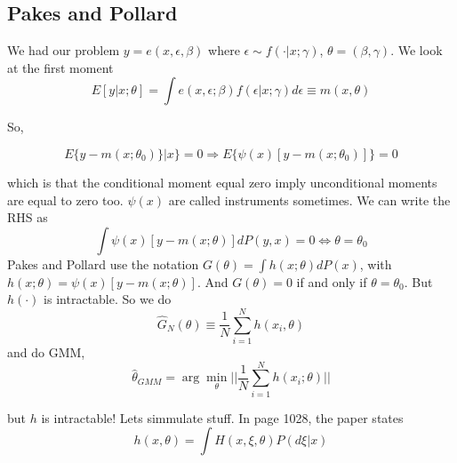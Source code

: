 \documentclass[12pt]{article}
\begin{document}
	\subsection{Pakes and Pollard}

	We had our problem $y=e(x,\epsilon, \beta)$ where $\epsilon \sim f(\cdot | x; \gamma ) $, $\theta = (\beta , \gamma)$. We look at the first moment
	\begin{equation}
		E[y | x; \theta] = \int e(x, \epsilon; \beta) f(\epsilon | x; \gamma) d \epsilon \equiv m(x, \theta)
	\end{equation}

	So,

	\begin{equation}
		E \{ y - m(x; \theta_0 )\} | x \} = 0 \Rightarrow E\{ \psi(x) [y - m(x; \theta_0 )] \} = 0
	\end{equation}

	which is that the conditional moment equal zero imply unconditional moments are equal to zero too. $\psi(x)$ are called instruments sometimes. We can write the RHS as
	\begin{equation}
		\int \psi(x) [y - m(x; \theta)] dP(y,x) = 0 \iff \theta = \theta_0
	\end{equation}
	 Pakes and Pollard use the notation $G(\theta) = \int h(x;\theta) dP(x)$, with $h(x;\theta) = \psi(x) [y - m(x; \theta)]$. And $G(\theta) = 0$ if and only if $\theta = \theta_0$. But $h(\cdot)$ is intractable. So we do
	 \begin{equation}
	 	\hat{G}_N(\theta) \equiv \frac{1}{N} \sum^N_{i=1} h(x_i, \theta)
	 \end{equation}
	 and do GMM,
	 \begin{equation}
	 	\hat{\theta}_{GMM} = \arg\min_{\theta} || \frac{1}{N} \sum^N_{i = 1} h(x_i; \theta) ||
	 \end{equation}

	 but $h$ is intractable! Lets simmulate stuff. In page 1028, the paper states
	 \begin{equation}
	 	h(x,\theta) = \int H(x, \xi, \theta ) P(d \xi | x)
	 \end{equation}
\end{document}

